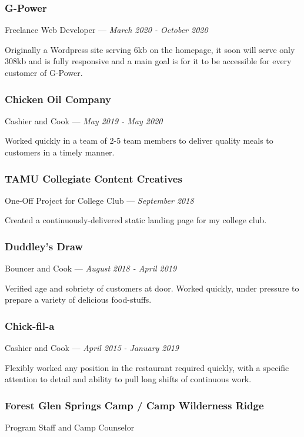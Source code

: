 \documentclass[letterpaper,10pt]{article}
\begin{document}
    \subsubsection{G-Power}
    \hfill Freelance Web Developer --- \emph{March 2020 - October 2020}

    Originally a Wordpress site serving 6kb on the homepage, it soon will serve only 308kb and is fully responsive and a main goal is for it to be accessible for every customer of G-Power.

    \subsubsection{Chicken Oil Company}
    \hfill Cashier and Cook --- \emph{May 2019 - May 2020}

    Worked quickly in a team of 2-5 team members to deliver quality meals to customers in a timely manner.

    \subsubsection{TAMU Collegiate Content Creatives}
    \hfill One-Off Project for College Club --- \emph{September 2018}

    Created a continuously-delivered static landing page for my college club.

    \subsubsection{Duddley's Draw}
    \hfill Bouncer and Cook --- \emph{August 2018 - April 2019}

    Verified age and sobriety of customers at door. Worked quickly, under pressure to prepare a variety of delicious food-stuffs.


    \subsubsection{Chick-fil-a}
    \hfill Cashier and Cook --- \emph{April 2015 - January 2019}

    Flexibly worked any position in the restaurant required quickly, with a specific attention to detail and ability to pull long shifts of continuous work.

    \subsubsection{Forest Glen Springs Camp / Camp Wilderness Ridge}
    \hfill Program Staff and Camp Counselor 
    
\end{document}
